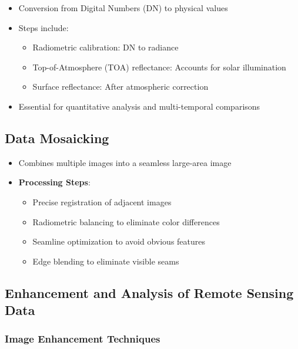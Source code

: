 \documentclass[
  letterpaper,
]{scrbook}
\providecommand{\tightlist}{%
  \setlength{\itemsep}{0pt}\setlength{\parskip}{0pt}}\usepackage{longtable,booktabs,array}
\begin{document}
\begin{itemize}
\tightlist
\item
  Conversion from Digital Numbers (DN) to physical values
\item
  Steps include:

  \begin{itemize}
  \tightlist
  \item
    Radiometric calibration: DN to radiance
  \item
    Top-of-Atmosphere (TOA) reflectance: Accounts for solar illumination
  \item
    Surface reflectance: After atmospheric correction
  \end{itemize}
\item
  Essential for quantitative analysis and multi-temporal comparisons
\end{itemize}

\subsection{Data Mosaicking}\label{data-mosaicking}

\begin{itemize}
\tightlist
\item
  Combines multiple images into a seamless large-area image
\item
  \textbf{Processing Steps}:

  \begin{itemize}
  \tightlist
  \item
    Precise registration of adjacent images
  \item
    Radiometric balancing to eliminate color differences
  \item
    Seamline optimization to avoid obvious features
  \item
    Edge blending to eliminate visible seams
  \end{itemize}
\end{itemize}

\subsection{Enhancement and Analysis of Remote Sensing
Data}\label{enhancement-and-analysis-of-remote-sensing-data}

\subsubsection{Image Enhancement
Techniques}\label{image-enhancement-techniques}
\end{document}
